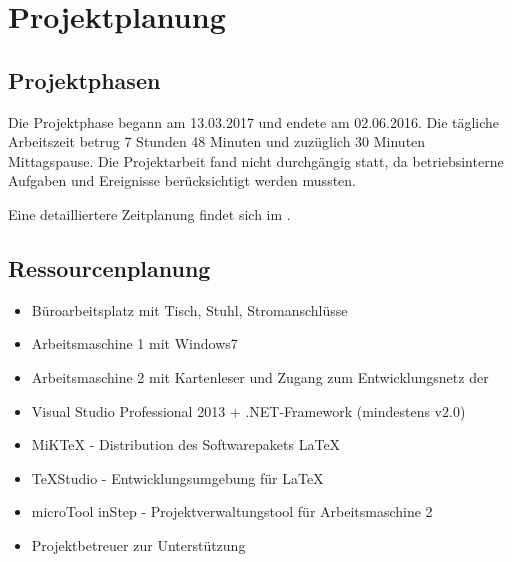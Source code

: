 
\clearpage
\section{Projektplanung} 
\label{sec:Projektplanung}


\subsection{Projektphasen}
\label{sec:Projektphasen}

Die Projektphase begann am 13.03.2017 und endete am 02.06.2016.
Die tägliche Arbeitszeit betrug 7 Stunden 48 Minuten und zuzüglich 30 Minuten Mittagspause.
Die Projektarbeit fand nicht durchgängig statt, da betriebsinterne Aufgaben und Ereignisse berücksichtigt werden mussten.


Eine detailliertere Zeitplanung findet sich im .

%

\subsection{Ressourcenplanung}
\label{sec:Ressourcenplanung}

\begin{itemize}
\renewcommand{\labelitemi}{}
\renewcommand{\labelitemii}{\textbullet}
\renewcommand{\labelitemiii}{\normalfont\bfseries\textendash}
		\begin{itemize}
			\item Büroarbeitsplatz mit Tisch, Stuhl, Stromanschlüsse
			\item Arbeitsmaschine 1 mit Windows7
			\item Arbeitsmaschine 2 mit Kartenleser und Zugang zum Entwicklungsnetz der \DRV
		\end{itemize}
\clearpage
		\begin{itemize}
			\item Visual Studio Professional 2013 + .NET-Framework (mindestens v2.0)
			\item MiKTeX - Distribution des Softwarepakets LaTeX
			\item TeXStudio - Entwicklungsumgebung für LaTeX
			\item microTool inStep - Projektverwaltungstool für Arbeitsmaschine 2
		\end{itemize}
		\begin{itemize}
			\item Projektbetreuer zur Unterstützung
		\end{itemize}
\end{itemize}

